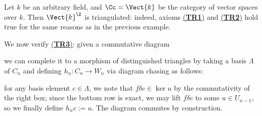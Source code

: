\begin{ex!}\label{Z-Vect}
    Let $k$ be an arbitrary field, and $\Cc = \Vect{k}$ be the category
    of vector spaces over $k$. Then $\Vect{k}^{\Z}$ is triangulated:
    indeed, axioms \hyperref[TR1]{(\textbf{TR1})} and
    \hyperref[TR2]{(\textbf{TR2})} hold true for the same
    reasons as in the previous example.

    We now verify \hyperref[TR3]{(\textbf{TR3})}:
    given a commutative diagram
    \begin{center}
    \end{center}
    we can complete it to a morphism of distinguished
    triangles by taking a basis $\Lambda$ of $C_{n}$ 
    and defining $h_{n}:C_{n} \to W_{n}$ via diagram chasing
    as follows:
    \begin{center}
    \end{center}
    for any basis element $c \in \Lambda$, we note
    that $f\delta c \in \ker u$ by the commutativity
    of the right box; since the bottom row is exact,
    we may lift $f\delta c$ to some $u \in U_{n-1}$,
    so we finally define $h_{n}c := u$. 
    The diagram commutes by construction.


\end{ex!}
